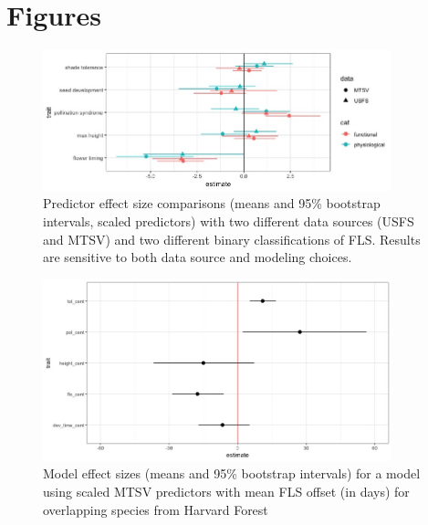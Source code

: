 \documentclass{article}\usepackage[]{graphicx}\usepackage[]{color}
\begin{document}
\begin{center}
\begin{tabular}{|c|l|}
\end{tabular}
\end{center}


\pagebreak

\section*{Figures}

\begin{figure}[here]
\includegraphics[width=0.9\textwidth]{..//figures/Data_comparision_plot.jpeg}
\caption{Predictor effect size comparisons (means and 95\% bootstrap intervals, scaled predictors) with two different data sources (USFS and MTSV) and two different binary classifications of FLS. Results are sensitive to both data source and modeling choices. }
\label{fig:Figure 1}
\end{figure}

\begin{center}
\begin{figure}[here]
\includegraphics[width=0.9\textwidth]{..//figures/HF_continuous_scaled_mode.jpeg} %
\caption{Model effect sizes (means and 95\% bootstrap intervals) for a model using scaled MTSV predictors with mean FLS offset (in days) for overlapping species from Harvard Forest}
\label{fig:Figure 2}
\end{figure}
\end{center}
\end{document}
